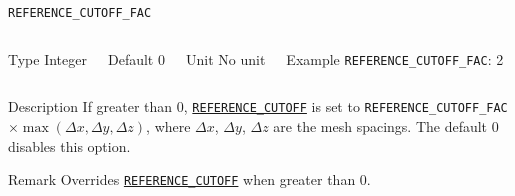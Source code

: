 \begin{frame}[allowframebreaks]{\texttt{REFERENCE\_CUTOFF\_FAC}} \label{REFERENCE_CUTOFF_FAC}
\vspace*{-12pt}
\begin{columns}
\begin{block}{Type}
Integer
\end{block}

\begin{block}{Default}
0
\end{block}

\begin{block}{Unit}
No unit
\end{block}

\begin{block}{Example}
\texttt{REFERENCE\_CUTOFF\_FAC}: 2
\end{block}
\end{columns}

\begin{block}{Description}
If greater than 0, \hyperlink{REFERENCE_CUTOFF}{\texttt{REFERENCE\_CUTOFF}} is set to \texttt{REFERENCE\_CUTOFF\_FAC} $\times \max(\Delta x, \Delta y, \Delta z)$, where $\Delta x$, $\Delta y$, $\Delta z$ are the mesh spacings. The default 0 disables this option.
\end{block}

\begin{block}{Remark}
Overrides \hyperlink{REFERENCE_CUTOFF}{\texttt{REFERENCE\_CUTOFF}} when greater than 0.
\end{block}

\end{frame}


